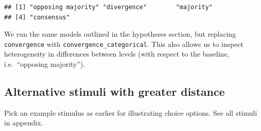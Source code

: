 \documentclass[
]{article}
\newenvironment{Shaded}{\begin{snugshade}}{\end{snugshade}}
\newcommand{\AttributeTok}[1]{\textcolor[rgb]{0.77,0.63,0.00}{#1}}
\newcommand{\CommentTok}[1]{\textcolor[rgb]{0.56,0.35,0.01}{\textit{#1}}}
\newcommand{\ConstantTok}[1]{\textcolor[rgb]{0.00,0.00,0.00}{#1}}
\newcommand{\FunctionTok}[1]{\textcolor[rgb]{0.00,0.00,0.00}{#1}}
\newcommand{\NormalTok}[1]{#1}
\newcommand{\OtherTok}[1]{\textcolor[rgb]{0.56,0.35,0.01}{#1}}
\newcommand{\SpecialCharTok}[1]{\textcolor[rgb]{0.00,0.00,0.00}{#1}}
\newcommand{\StringTok}[1]{\textcolor[rgb]{0.31,0.60,0.02}{#1}}
\begin{document}
\begin{Shaded}
\end{Shaded}

\begin{verbatim}
## [1] "opposing majority" "divergence"        "majority"         
## [4] "consensus"
\end{verbatim}

We run the same models outlined in the hypotheses section, but replacing
\texttt{convergence} with \texttt{convergence\_categorical}. This also
allows us to inspect heterogeneity in differences between levels (with
respect to the baseline, i.e.~``opposing majority'').

\hypertarget{alternative-stimuli-with-greater-distance}{%
\subsection{Alternative stimuli with greater
distance}\label{alternative-stimuli-with-greater-distance}}

Pick an example stimulus as earlier for illustrating choice options. See
all stimuli in appendix.
\end{document}
